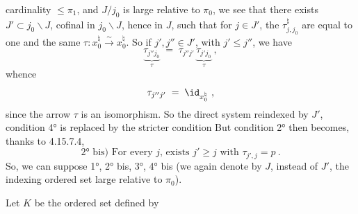 cardinality $\leqslant \pi_1$, and $J/j_0$ is large relative to $\pi_0$, we see that there exists $J' \subset j_0\backslash J$, cofinal in $j_0\backslash J$, hence in $J$, such that for $j \in J'$, the $\tau^\natural_{j,j_0}$ are equal to one and the same $\tau : x_0^\natural \xrightarrow{\sim} x_0^\natural$. So if $j', j'' \in J'$, with $j' \leqslant j''$, we have
\[
\underbrace{\tau_{j''j_0}}_{\tau} \;=\; \tau_{j''j'}\,\underbrace{\tau_{j'j_0}}_{\tau}\ ,
\]
whence
\[
\tau_{j''j'} \;=\; \id_{x_0^\natural}\ ,
\]
since the arrow $\tau$ is an isomorphism. So the direct system reindexed by $J'$, condition 4° is replaced by the stricter condition  But condition 2° then becomes, thanks to 4.15.7.4,
\[
\boxed{\text{2° bis) For every } j\text{, exists } j' \geqslant j \text{ with } \tau_{j',j} = p}\ .
\]
So, we can suppose 1°, 2° bis, 3°, 4° bis (we again denote by $J$, instead of $J'$, the indexing ordered set large relative to $\pi_0$).

Let $K$ be the ordered set defined by

